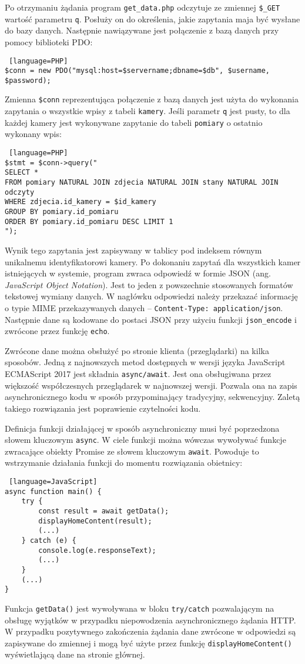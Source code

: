 \documentclass[a4paper,11pt,twoside]{article}
\begin{document}
Po otrzymaniu żądania program \texttt{get{\_}data.php} odczytuje ze zmiennej \texttt{{\$\_}GET} wartość parametru \texttt{q}. Posłuży on do określenia, jakie zapytania maja być wysłane do bazy danych. Następnie nawiązywane jest połączenie z bazą danych przy pomocy biblioteki PDO:
\begin{lstlisting} [language=PHP]
$conn = new PDO("mysql:host=$servername;dbname=$db", $username, $password);
\end{lstlisting}
Zmienna \texttt{\$conn} reprezentująca połączenie z bazą danych jest użyta do wykonania zapytania o wszystkie wpisy z tabeli \texttt{kamery}. Jeśli parametr \texttt{q} jest pusty, to dla każdej kamery jest wykonywane zapytanie do tabeli \texttt{pomiary} o ostatnio wykonany wpis:
\begin{lstlisting} [language=PHP]
$stmt = $conn->query("
SELECT *
FROM pomiary NATURAL JOIN zdjecia NATURAL JOIN stany NATURAL JOIN odczyty
WHERE zdjecia.id_kamery = $id_kamery 
GROUP BY pomiary.id_pomiaru 
ORDER BY pomiary.id_pomiaru DESC LIMIT 1
");
\end{lstlisting}
Wynik tego zapytania jest zapisywany w tablicy pod indeksem równym unikalnemu identyfikatorowi kamery. Po dokonaniu zapytań dla wszystkich kamer istniejących w systemie, program zwraca odpowiedź w formie JSON (ang. \textit{JavaScript Object Notation}). Jest to jeden z powszechnie stosowanych formatów tekstowej wymiany danych. W nagłówku odpowiedzi należy przekazać informację o typie MIME przekazywanych danych\cite{mime2} -- \texttt{Content-Type: \linebreak application/json}. Następnie dane są kodowane do postaci JSON przy użyciu funkcji \linebreak\texttt{json{\_}encode} i zwrócone przez funkcję \texttt{echo}.

Zwrócone dane można obsłużyć po stronie klienta (przeglądarki) na kilka sposobów. Jedną z najnowszych metod dostępnych w wersji języka JavaScript ECMAScript 2017 jest składnia \texttt{async/await}. Jest ona obsługiwana przez większość współczesnych przeglądarek w najnowszej wersji.\cite{async} Pozwala ona na zapis asynchronicznego kodu w sposób przypominający tradycyjny, sekwencyjny. Zaletą takiego rozwiązania jest poprawienie czytelności kodu. 

Definicja funkcji działającej w sposób asynchroniczny musi być poprzedzona słowem kluczowym \texttt{async}. W ciele funkcji można wówczas wywoływać funkcje zwracające obiekty Promise ze słowem kluczowym \texttt{await}. Powoduje to wstrzymanie działania funkcji do momentu rozwiązania obietnicy:
\begin{lstlisting} [language=JavaScript]
async function main() {
    try {
        const result = await getData();
        displayHomeContent(result);
        (...)
    } catch (e) {
        console.log(e.responseText);
        (...)
    }
	(...)
}
\end{lstlisting}
Funkcja \texttt{getData()} jest wywoływana w bloku \texttt{try/catch} pozwalającym na obsługę wyjątków w przypadku niepowodzenia asynchronicznego żądania HTTP. W przypadku pozytywnego zakończenia żądania dane zwrócone w odpowiedzi są zapisywane do zmiennej i mogą być użyte przez funkcję \texttt{displayHomeContent()} wyświetlającą dane na stronie głównej.
\end{document}
